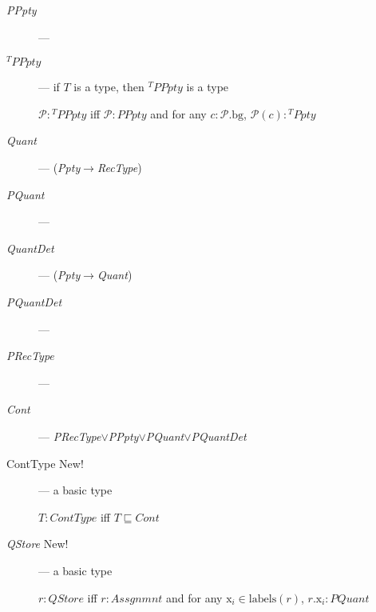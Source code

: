 \begin{description}
      \item[\textnormal{\textit{PPpty}}] --- 

        
      \item[\textnormal{$^T\textit{PPpty}$}] --- if $T$ is a
        type, then $^T\textit{PPpty}$ is a type

        $\mathcal{P}:{^T\textit{PPpty}}$ iff
  $\mathcal{P}:\textit{PPpty}$ and for any $c:\mathcal{P}.\text{bg}$, $\mathcal{P}(c):{^T\textit{Ppty}}$
        
      \item[\textnormal{\textit{Quant}}] ---
        (\textit{Ppty}$\rightarrow$\textit{RecType})
        
      \item[\textnormal{\textit{PQuant}}] --- 
        
      \item[\textnormal{\textit{QuantDet}}] ---
        (\textit{Ppty}$\rightarrow$\textit{Quant})
        
      \item[\textnormal{\textit{PQuantDet}}] ---
        
      \item[\textnormal{\textit{PRecType}}] ---
          

    \item[\textnormal{\textit{Cont}}] ---
      \textit{PRecType}$\vee$\textit{PPpty}$\vee$\textit{PQuant}$\vee$\textit{PQuantDet}

      
    \item[\textnormal{ContType} New!] ---  a basic type

      $T : \textit{ContType}$ iff $T\sqsubseteq\textit{Cont}$

      
    \item[\textnormal{\textit{QStore}} New!] --- a basic type

      $r:\textit{QStore}$ iff $r:Assgnmnt$
and for any $\text{x}_i\in\mathrm{labels}(r)$,
$r.\text{x}_i:\textit{PQuant}$


\end{description}
